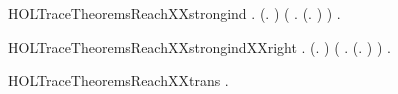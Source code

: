 \begin{SaveVerbatim}{HOLTraceTheoremsReachXXstrongind}
\HOLTokenTurnstile{} \HOLSymConst{\HOLTokenForall{}}.
       (\HOLSymConst{\HOLTokenForall{}}.   ) \HOLSymConst{\HOLTokenConj{}}
       (\HOLSymConst{\HOLTokenForall{}}  . (\HOLSymConst{\HOLTokenExists{}}.  \HOLTokenTransBegin{}\HOLTokenTransEnd {}) \HOLSymConst{\HOLTokenConj{}}    \HOLSymConst{\HOLTokenConj{}}    \HOLSymConst{\HOLTokenImp{}}   ) \HOLSymConst{\HOLTokenImp{}}
       \HOLSymConst{\HOLTokenForall{}} .    \HOLSymConst{\HOLTokenImp{}}   
\end{SaveVerbatim}
\newcommand{\HOLTraceTheoremsReachXXstrongind}{\UseVerbatim{HOLTraceTheoremsReachXXstrongind}}
\begin{SaveVerbatim}{HOLTraceTheoremsReachXXstrongindXXright}
\HOLTokenTurnstile{} \HOLSymConst{\HOLTokenForall{}}.
       (\HOLSymConst{\HOLTokenForall{}}.   ) \HOLSymConst{\HOLTokenConj{}}
       (\HOLSymConst{\HOLTokenForall{}}  .    \HOLSymConst{\HOLTokenConj{}}    \HOLSymConst{\HOLTokenConj{}} (\HOLSymConst{\HOLTokenExists{}}.  \HOLTokenTransBegin{}\HOLTokenTransEnd {}) \HOLSymConst{\HOLTokenImp{}}   ) \HOLSymConst{\HOLTokenImp{}}
       \HOLSymConst{\HOLTokenForall{}} .    \HOLSymConst{\HOLTokenImp{}}   
\end{SaveVerbatim}
\newcommand{\HOLTraceTheoremsReachXXstrongindXXright}{\UseVerbatim{HOLTraceTheoremsReachXXstrongindXXright}}
\begin{SaveVerbatim}{HOLTraceTheoremsReachXXtrans}
\HOLTokenTurnstile{} \HOLSymConst{\HOLTokenForall{}}  .    \HOLSymConst{\HOLTokenConj{}}    \HOLSymConst{\HOLTokenImp{}}   
\end{SaveVerbatim}
